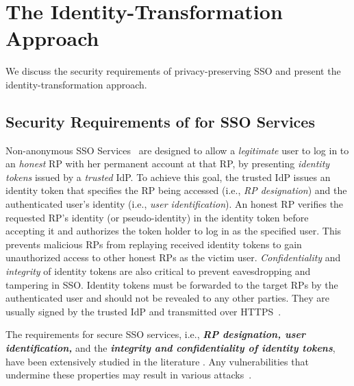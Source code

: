 \section{The Identity-Transformation Approach}
\label{sec:challenge}

We discuss the security requirements of privacy-preserving SSO and present the identity-transformation approach.


\subsection{Security Requirements of for SSO Services}
\label{subsec:basicrequirements}

Non-anonymous SSO Services~\cite{OpenIDConnect,rfc6749,SAML,SAMLIdentifier,NIST2017draft} are designed to allow a \emph{legitimate} user to log in to an \emph{honest} RP with her permanent account at that RP, %
by presenting \emph{identity tokens} issued by a \emph{trusted} IdP. To achieve this goal, the trusted IdP issues an identity token that specifies the RP being accessed (i.e., \emph{RP designation}) and  the authenticated user's identity (i.e., \emph{user identification}). An honest RP verifies the requested RP's identity (or pseudo-identity) in the identity token before accepting it and authorizes the token holder to log in as the specified user. This prevents malicious RPs from replaying received identity tokens to gain unauthorized access to other honest RPs as the victim user. 
\emph{Confidentiality} and \emph{integrity} of identity tokens are also critical to prevent eavesdropping and tampering in SSO. Identity tokens must be forwarded to the target RPs by the authenticated user and should not be revealed to any other parties. %
They are usually signed by the trusted IdP and transmitted over HTTPS~\cite{OpenIDConnect,rfc6749,SAML}.

The requirements for secure SSO services, i.e., {\bf {\em RP designation, user identification,}} and the {\bf {\em integrity and confidentiality of identity tokens}}, have been extensively studied in the literature \cite{ArmandoCCCT08, FettKS16, FettKS17}.
Any vulnerabilities that undermine these properties may result in various attacks~\cite{SomorovskyMSKJ12, WangCW12, ArmandoCCCPS13, ZhouE14, WangZLLYLG15, WangZLG16, YangLLZH16, MainkaMS16, MainkaMSW17, YangLCZ18, YangLS17, ShiWL19, ChenPCTKT14, ccsSunB12, DiscoveringJCS, dimvaLiM16, CaoSBKVC14, TowardsShehabM14}.


